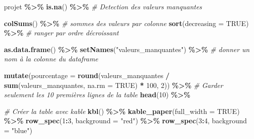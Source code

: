 \documentclass[
]{article}
\newenvironment{Shaded}{\begin{snugshade}}{\end{snugshade}}
\newcommand{\AttributeTok}[1]{\textcolor[rgb]{0.13,0.29,0.53}{#1}}
\newcommand{\CommentTok}[1]{\textcolor[rgb]{0.56,0.35,0.01}{\textit{#1}}}
\newcommand{\ConstantTok}[1]{\textcolor[rgb]{0.56,0.35,0.01}{#1}}
\newcommand{\DecValTok}[1]{\textcolor[rgb]{0.00,0.00,0.81}{#1}}
\newcommand{\FunctionTok}[1]{\textcolor[rgb]{0.13,0.29,0.53}{\textbf{#1}}}
\newcommand{\NormalTok}[1]{#1}
\newcommand{\SpecialCharTok}[1]{\textcolor[rgb]{0.81,0.36,0.00}{\textbf{#1}}}
\newcommand{\StringTok}[1]{\textcolor[rgb]{0.31,0.60,0.02}{#1}}
\begin{document}
\begin{Shaded}
\begin{Highlighting}[]
\NormalTok{projet }\SpecialCharTok{\%\textgreater{}\%}
          \FunctionTok{is.na}\NormalTok{() }\SpecialCharTok{\%\textgreater{}\%}                \CommentTok{\# Detection des valeurs manquantes}
          
          \FunctionTok{colSums}\NormalTok{() }\SpecialCharTok{\%\textgreater{}\%}            \CommentTok{\# sommes des valeurs par colonne}
          \FunctionTok{sort}\NormalTok{(}\AttributeTok{decreasing =} \ConstantTok{TRUE}\NormalTok{) }\SpecialCharTok{\%\textgreater{}\%} \CommentTok{\# ranger par ordre décroissant}
          
          \FunctionTok{as.data.frame}\NormalTok{() }\SpecialCharTok{\%\textgreater{}\%}
          \FunctionTok{setNames}\NormalTok{(}\StringTok{"valeurs\_manquantes"}\NormalTok{) }\SpecialCharTok{\%\textgreater{}\%}  \CommentTok{\# donner un nom à la colonne du dataframe}
          
          \FunctionTok{mutate}\NormalTok{(}\AttributeTok{pourcentage =} \FunctionTok{round}\NormalTok{(valeurs\_manquantes }\SpecialCharTok{/} \FunctionTok{sum}\NormalTok{(valeurs\_manquantes, }\AttributeTok{na.rm =} \ConstantTok{TRUE}\NormalTok{) }\SpecialCharTok{*} \DecValTok{100}\NormalTok{, }\DecValTok{2}\NormalTok{)) }\SpecialCharTok{\%\textgreater{}\%} 
        \CommentTok{\# Garder seulement les 10 premières lignes de la table}
          \FunctionTok{head}\NormalTok{(}\DecValTok{10}\NormalTok{) }\SpecialCharTok{\%\textgreater{}\%} 
        
  
          \CommentTok{\# Créer la table avec kable}
          \FunctionTok{kbl}\NormalTok{() }\SpecialCharTok{\%\textgreater{}\%}
          \FunctionTok{kable\_paper}\NormalTok{(}\AttributeTok{full\_width =} \ConstantTok{TRUE}\NormalTok{) }\SpecialCharTok{\%\textgreater{}\%}
          \FunctionTok{row\_spec}\NormalTok{(}\DecValTok{1}\SpecialCharTok{:}\DecValTok{3}\NormalTok{, }\AttributeTok{background =} \StringTok{"red"}\NormalTok{) }\SpecialCharTok{\%\textgreater{}\%} 
          \FunctionTok{row\_spec}\NormalTok{(}\DecValTok{3}\SpecialCharTok{:}\DecValTok{4}\NormalTok{, }\AttributeTok{background =} \StringTok{"blue"}\NormalTok{)}
\end{Highlighting}
\end{Shaded}
\end{document}
